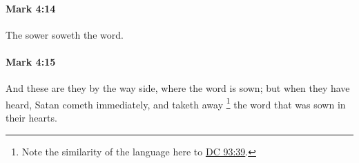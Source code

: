 		\paragraph{Mark 4:14} %
			\label{MARK-4-14}

			The sower soweth the word.

			\begin{framed}
			\scriptsize
				\begin{compactdesc}
					\item[SBLG] 
				\end{compactdesc}
			\end{framed}

		\paragraph{Mark 4:15} %
			\label{MARK-4-15}

			And these are they by the way side, where the word is sown; but when they have heard, Satan cometh immediately, and taketh away%
				\footnote{%
					Note the similarity of the language here to \hyperref[DC93-39]{DC 93:39}.
					} 
			the word that was sown in their hearts.


